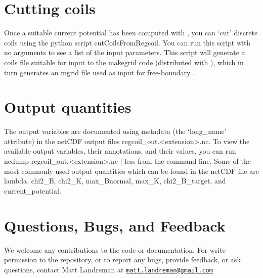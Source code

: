 \section{Cutting coils}

Once a suitable current potential has been computed with \regcoil, you can `cut' discrete coils
using the python script {\ttfamily cutCoilsFromRegcoil}. You can run this script with no arguments
to see a list of the input parameters. This script will generate a coils file suitable for input to the
{\ttfamily makegrid} code (distributed with \vmec), which in turn generates an mgrid file used as input for free-boundary \vmec.

\section{Output quantities}

The output variables are documented using metadata (the `{\ttfamily long\_name}' attribute)
in the netCDF output files {\ttfamily regcoil\_out.<extension>.nc}.
To view the available output variables, their annotations, and their values, you can run
{\ttfamily ncdump regcoil\_out.<extension>.nc | less} from the command line.
Some of the most commonly used output quantities which can be found in the netCDF file are 
{\ttfamily lambda},
{\ttfamily chi2\_B},
{\ttfamily chi2\_K},
{\ttfamily max\_Bnormal},
{\ttfamily max\_K},
{\ttfamily chi2\_B\_target},
and
{\ttfamily current\_potential}.

\section{Questions, Bugs, and Feedback}

We welcome any contributions to the code or documentation.
For write permission to the repository, or to report any bugs, provide feedback, or ask questions, contact Matt Landreman at
\href{mailto:matt.landreman@gmail.com}{\nolinkurl{matt.landreman@gmail.com} }






